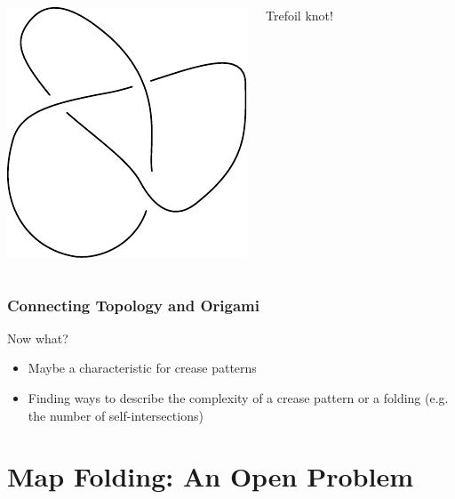 \documentclass{beamer}
\begin{document}
\begin{frame}
\begin{columns}[c]
\pause
\includegraphics[width=.8\textwidth]{knot_pix/knot_4.pdf}
\pause

Trefoil knot!
\end{columns}
\end{frame}

\begin{frame}
\frametitle{Connecting Topology and Origami}
\begin{block}{Now what? }
\begin{itemize}
\item Maybe a characteristic for crease patterns
\item Finding ways to describe the complexity of a crease pattern or a folding (e.g. the number of self-intersections)
\end{itemize}
\end{block}
\end{frame}



\section{Map Folding: An Open Problem}
\end{document}
